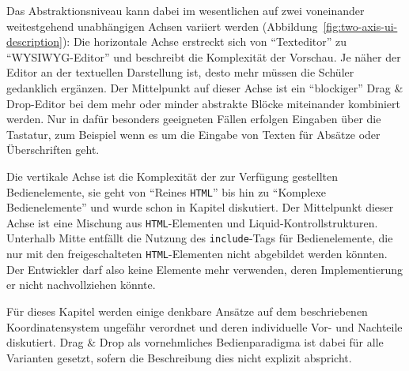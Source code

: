 Das Abstraktionsniveau kann dabei im wesentlichen auf zwei voneinander weitestgehend unabhängigen Achsen variiert werden (Abbildung~\ref{fig:two-axis-ui-description}): Die horizontale Achse erstreckt sich von "`Texteditor"' zu "`WYSIWYG-Editor"' und beschreibt die Komplexität der Vorschau. Je näher der Editor an der textuellen Darstellung ist, desto mehr müssen die Schüler gedanklich ergänzen. Der Mittelpunkt auf dieser Achse ist ein "`blockiger"' Drag \& Drop-Editor bei dem mehr oder minder abstrakte Blöcke miteinander kombiniert werden. Nur in dafür besonders geeigneten Fällen erfolgen Eingaben über die Tastatur, zum Beispiel wenn es um die Eingabe von Texten für Absätze oder Überschriften geht.

Die vertikale Achse ist die Komplexität der zur Verfügung gestellten Bedienelemente, sie geht von "`Reines \texttt{HTML}"' bis hin zu "`Komplexe Bedienelemente"' und wurde schon in Kapitel  diskutiert. Der Mittelpunkt dieser Achse ist eine Mischung aus \texttt{HTML}-Elementen und Liquid-Kontrollstrukturen. Unterhalb Mitte entfällt die Nutzung des \texttt{include}-Tags für Bedienelemente, die nur mit den freigeschalteten \texttt{HTML}-Elementen nicht abgebildet werden könnten. Der Entwickler darf also keine Elemente mehr verwenden, deren Implementierung er nicht nachvollziehen könnte.

Für dieses Kapitel werden einige denkbare Ansätze auf dem beschriebenen Koordinatensystem ungefähr verordnet und deren individuelle Vor- und Nachteile diskutiert. Drag \& Drop als vornehmliches Bedienparadigma ist dabei für alle Varianten gesetzt, sofern die Beschreibung dies nicht explizit abspricht.

